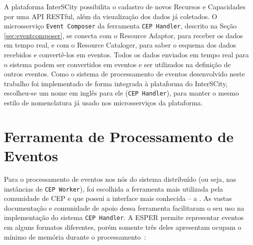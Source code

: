 A plataforma InterSCity possibilita o cadastro de novos Recursos e Capacidades por uma API RESTful, além da visualização dos dados já coletados. O microsserviço \texttt{Event Composer} da ferramenta \texttt{CEP Handler}, descrito na Seção \ref{sec:eventcomposer}, se conecta com o Resource Adaptor, para receber os dados em tempo real, e com o Resource Cataloger, para saber o esquema dos dados recebidos e convertê-los em eventos. Todos os dados enviados em tempo real para o sistema podem ser convertidos em eventos e ser utilizados na definição de outros eventos.
Como o sistema de processamento de eventos desenvolvido neste trabalho foi implementado de forma integrada à plataforma do InterSCity, escolheu-se um nome em inglês para ele (\texttt{CEP Handler}), para manter o mesmo estilo de nomenclatura já usado nos microsserviços da plataforma.  


\section{Ferramenta de Processamento de Eventos}
Para o processamento de eventos nos nós do sistema distribuído (ou seja, nas instâncias de \texttt{CEP Worker}), foi escolhida a ferramenta mais utilizada pela comunidade de CEP e que possui a interface mais conhecida -- a \cite{Esper}. As vastas documentação e comunidade de apoio dessa ferramenta facilitaram o seu uso na implementação do sistema \texttt{CEP Handler}. %
A ESPER permite representar eventos em alguns formatos diferentes, porém somente três deles apresentam ocupam o mínimo de memória durante o processamento~\citep{EsperEventRepresentation}: %

